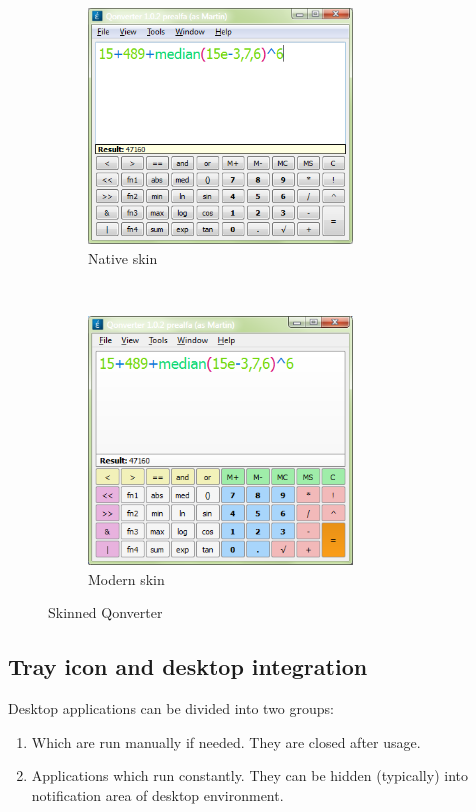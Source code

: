 \begin{figure}[ht]
\centering
\begin{subfigure}[b]{0.48\textwidth}
\centering
\includegraphics[width=7cm]{graphics/real-world/00-qon-native}
\caption{Native skin}
\end{subfigure}
~
\begin{subfigure}[b]{0.48\textwidth}
\centering
\includegraphics[width=7cm]{graphics/real-world/00-qon-modern}
\caption{Modern skin}
\end{subfigure}
\caption{Skinned Qonverter}\label{figure:skinsq}
\end{figure}

\subsection{Tray icon and desktop integration}
Desktop applications can be divided into two groups:
\begin{enumerate}
\item Which are run manually if needed. They are closed after usage.
\item Applications which run constantly. They can be hidden (typically) into notification area of desktop environment.
\end{enumerate}

